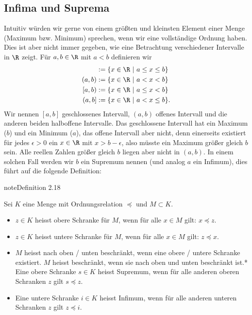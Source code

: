\documentclass[letterpaper,10pt,english]{jupyterBook}
\begin{document}
\subsection{Infima und Suprema}
\label{\detokenize{grundlagen/zahlensysteme:infima-und-suprema}}
Intuitiv würden wir gerne von einem größten und kleinsten Element einer Menge (Maximum bzw. Minimum) sprechen, wenn wir eine vollständige Ordnung haben. Dies ist aber nicht immer gegeben, wie eine Betrachtung verschiedener Intervalle in \(\R\) zeigt. Für \(a,b \in \R\) mit \(a < b\) definieren wir
\begin{align*}
[a,b] &:= \{x \in \R~|~a \leq x \leq b\} \\
(a,b) &:= \{x \in \R~|~a < x < b\} \\
[a,b) &:= \{x \in \R~|~a \leq x < b\} \\
(a,b] &:= \{x \in \R~|~a < x \leq b\}.
\end{align*}
Wir nennen \([a,b]\) geschlossenes Intervall, \((a,b)\) offenes Intervall und die anderen beiden halboffene Intervalle. Das geschlossene Intervall hat ein Maximum (\(b\)) und ein Minimum (\(a\)), das offene Intervall aber nicht, denn einerseits existiert für jedes \(\epsilon > 0\) ein \(x \in \R\) mit \(x>b-\epsilon\), also müsste ein Maximum größer gleich \(b\) sein. Alle reellen Zahlen größer gleich \(b\) liegen aber nicht in \((a,b)\). In einem solchen Fall werden wir \(b\) ein Supremum nennen (und analog \(a\) ein Infimum), dies führt auf die folgende Definition:
\label{grundlagen/zahlensysteme:definition-27}
\begin{sphinxadmonition}{note}{Definition 2.18}



Sei \(K\) eine Menge mit Ordnungsrelation \(\preceq\) und \(M \subset K\).
\begin{itemize}
\item {} 
\(z \in K\) heisst obere Schranke für \(M\), wenn für alle \(x \in M\) gilt: \(x \preceq z\).

\item {} 
\(z \in K\) heisst untere Schranke für \(M\), wenn für alle \(x \in M\) gilt: \(z \preceq x\).

\item {} 
\(M\) heisst nach oben / unten beschränkt, wenn eine obere / untere Schranke existiert. \(M\) heisst beschränkt, wenn sie nach oben und unten beschränkt ist.* Eine obere Schranke \(s \in K\) heisst Supremum, wenn für alle anderen oberen Schranken \(z\) gilt \(s \preceq z\).

\item {} 
Eine untere Schranke \(i \in K\) heisst Infimum, wenn für alle anderen unteren Schranken \(z\) gilt \(z \preceq i\).

\end{itemize}
\end{sphinxadmonition}
\end{document}
